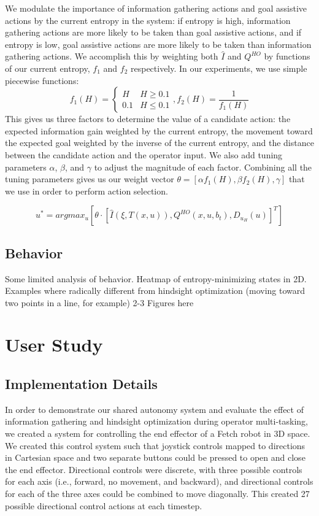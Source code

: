 \documentclass[conference]{IEEEtran}
\begin{document}
We modulate the importance of information gathering actions and goal assistive actions by the current entropy in the system: if entropy is high, information gathering actions are more likely to be taken than goal assistive actions, and if entropy is low, goal assistive actions are more likely to be taken than information gathering actions. We accomplish this by weighting both $\hat{I}$ and $Q^{HO}$ by functions of our current entropy, $f_1$ and $f_2$ respectively. In our experiments, we use simple piecewise functions:
\[
f_1(H) = 
\begin{cases}
H & H\geq 0.1 \\
0.1 & H\leq 0.1
\end{cases}
,f_2(H) = \frac{1}{f_1(H)}
\]
This gives us three factors to determine the value of a candidate action: the expected information gain weighted by the current entropy, the movement toward the expected goal weighted by the inverse of the current entropy, and the distance between the candidate action and the operator input. We also add tuning parameters $\alpha$, $\beta$, and $\gamma$ to adjust the magnitude of each factor. Combining all the tuning parameters gives us our weight vector $\theta = [\alpha f_1(H), \beta f_2(H), \gamma]$ that we use in order to perform action selection.

\[
u^* = argmax_u [ \theta \cdot [\hat{I}(\xi, T(x,u)), Q^{HO}(x,u,b_t), D_{u_H}(u)]^T ]
\]

\subsection{Behavior}

Some limited analysis of behavior. Heatmap of entropy-minimizing states in 2D. Examples where radically different from hindsight optimization (moving toward two points in a line, for example)
2-3 Figures here

\section{User Study}

\subsection{Implementation Details}
In order to demonstrate our shared autonomy system and evaluate the effect of information gathering and hindsight optimization during operator multi-tasking, we created a system for controlling the end effector of a Fetch robot in 3D space. We created this control system such that joystick controls mapped to directions in Cartesian space and two separate buttons could be pressed to open and close the end effector. Directional controls were discrete, with three possible controls for each axis (i.e., forward, no movement, and backward), and directional controls for each of the three axes could be combined to move diagonally. This created 27 possible directional control actions at each timestep. 
\end{document}
